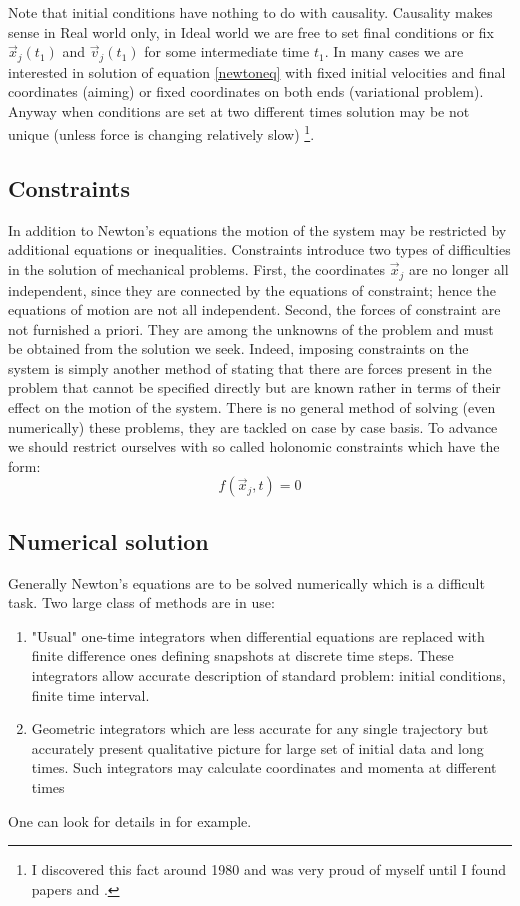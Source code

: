 Note that initial conditions have nothing to do with causality. Causality makes sense in Real world only,
in Ideal world we are free to set final conditions or fix $\vec x_j(t_1)$ and $\vec v_j(t_1)$ for
some intermediate time $t_1$. In many cases we are 
interested in solution of equation \eqref{newtoneq} with fixed initial velocities and final
coordinates  (aiming) or fixed coordinates on both ends (variational problem). Anyway when
conditions are set at two different times  solution may be not unique (unless force is changing relatively slow)
\footnote {I discovered this fact around 1980 and was very proud of myself until I found papers \cite{Maslov-1} and 
\cite{Maslov-2}.}.

        \subsection{Constraints}
In addition to Newton's equations the motion of the system may be restricted by additional equations or inequalities.
Constraints introduce two types of difficulties in the solution of mechanical
problems. First, the coordinates $\vec x_j$ are no longer all independent, since they are
connected by the equations of constraint; hence the equations of motion  
are not all independent. Second, the forces of constraint  are not furnished a priori. 
They are among the unknowns of the problem and must be obtained from the
solution we seek. Indeed, imposing constraints on the system  is simply another
method of stating that there are forces present in the problem that cannot be specified 
directly but are known rather in terms of their effect on the motion of the system.
There is no general method of solving (even numerically) these problems, they are tackled on case by case basis.
To advance we should restrict ourselves with so called holonomic constraints which have the form:
\begin{equation}
        f(\vec x_j,t)=0 \label {hol-const}
\end{equation}

\subsection{Numerical solution}
Generally Newton's equations are to be solved numerically which is a difficult task. 
Two large class of methods are in use:
\begin{enumerate}
        \item "Usual" one-time integrators when differential equations are replaced with finite difference
ones defining snapshots at discrete time steps. These integrators allow accurate description of standard problem:
initial conditions, finite time interval.
\item Geometric integrators which are less accurate for any single trajectory but accurately present qualitative 
        picture for large set of initial data and long times. Such integrators may calculate  coordinates and 
                momenta at different times
\end{enumerate}
One can look for details in \cite{Hairer-Lubich-Wanner} for example. 

